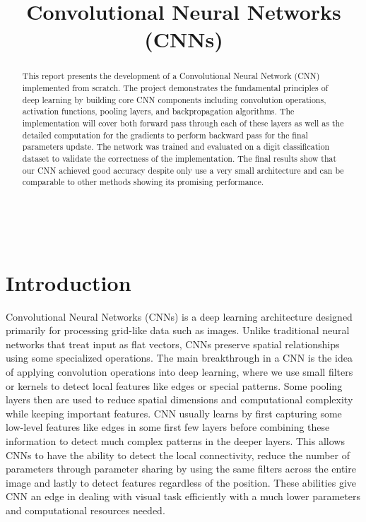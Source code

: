 \documentclass[conference]{IEEEtran}
\begin{document}
\title{Convolutional Neural Networks (CNNs)}\\

\author{
}

\maketitle
\thispagestyle{plain}
\pagestyle{plain}

\begin{abstract}
This report presents the development of a Convolutional Neural Network (CNN) implemented from scratch. The project demonstrates the fundamental principles of deep learning by building core CNN components including convolution operations, activation functions, pooling layers, and backpropagation algorithms. The implementation will cover both forward pass through each of these layers as well as the detailed computation for the gradients to perform backward pass for the final parameters update. The network was trained and evaluated on a digit classification dataset to validate the correctness of the implementation. The final results show that our CNN achieved good accuracy despite only use a very small architecture and can be comparable to other methods showing its promising performance.
\end{abstract}


\section{Introduction}
Convolutional Neural Networks (CNNs) is a deep learning architecture designed primarily for processing grid-like data such as images. Unlike traditional neural networks that treat input as flat vectors, CNNs preserve spatial relationships using some specialized operations. The main breakthrough in a CNN is the idea of applying convolution operations into deep learning, where we use small filters or kernels to detect local features like edges or special patterns. Some pooling layers then are used to reduce spatial dimensions and computational complexity while keeping important features. CNN usually learns by first capturing some low-level features like edges in some first few layers before combining these information to detect much complex patterns in the deeper layers. This allows CNNs to have the ability to detect the local connectivity, reduce the number of parameters through parameter sharing by using the same filters across the entire image and lastly to detect features regardless of the position. These abilities give CNN an edge in dealing with visual task efficiently with a much lower parameters and computational resources needed.
\end{document}
